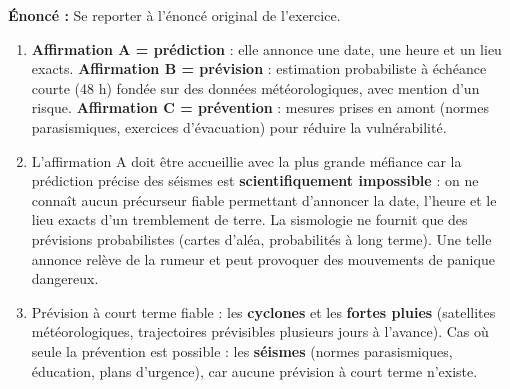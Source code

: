 \documentclass[11pt]{article}
\begin{document}
\begin{corrige}
\textbf{Énoncé :} Se reporter à l'énoncé original de l'exercice.
\tcblower
\begin{enumerate}
\item \textbf{Affirmation A = prédiction} : elle annonce une date, une heure et un lieu exacts. \textbf{Affirmation B = prévision} : estimation probabiliste à échéance courte (48 h) fondée sur des données météorologiques, avec mention d'un risque. \textbf{Affirmation C = prévention} : mesures prises en amont (normes parasismiques, exercices d'évacuation) pour réduire la vulnérabilité.
\item L'affirmation A doit être accueillie avec la plus grande méfiance car la prédiction précise des séismes est \textbf{scientifiquement impossible} : on ne connaît aucun précurseur fiable permettant d'annoncer la date, l'heure et le lieu exacts d'un tremblement de terre. La sismologie ne fournit que des prévisions probabilistes (cartes d'aléa, probabilités à long terme). Une telle annonce relève de la rumeur et peut provoquer des mouvements de panique dangereux.
\item Prévision à court terme fiable : les \textbf{cyclones} et les \textbf{fortes pluies} (satellites météorologiques, trajectoires prévisibles plusieurs jours à l'avance). Cas où seule la prévention est possible : les \textbf{séismes} (normes parasismiques, éducation, plans d'urgence), car aucune prévision à court terme n'existe.
\end{enumerate}
\end{corrige}
\end{document}
